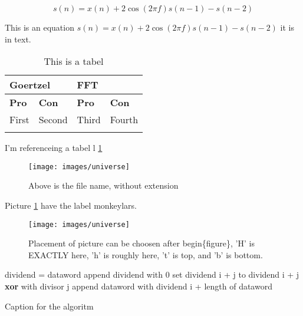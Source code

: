 \documentclass[a4paper,11pt,danish,oneside]{article}
\begin{document}
\begin{equation}
	s(n)=x(n)+2 \cos(2 \pi f) s(n-1)-s(n-2)
\end{equation}

This is an equation $s(n)=x(n)+2 \cos(2 \pi f) s(n-1)-s(n-2)$ it is in text.

\begin{table}[h]
	\begin{tabularx}{\textwidth}{|X|X|X|X|}
		\hline
		\multicolumn{2}{|l|}{\textbf{Goertzel}} & \multicolumn{2}{l|}{\textbf{FFT}} \\ \hline
	\textbf{Pro} & \textbf{Con} & \textbf{Pro} & \textbf{Con} \\ \hline
	First & Second & Third & Fourth \\ \hline
	& & & \\ \hline
	\end{tabularx}
	\caption{This is a tabel}
	\label{tabel1}
\end{table}

I'm referenceing a tabel l \ref{tabel1}

\begin{figure}[h]
	\centering
	\texttt{[image: images/universe]}
	\caption{Above is the file name, without extension}
	\label{monkeylars}
\end{figure}

Picture \ref{monkeylars} have the label monkeylars.


\begin{figure}[H]
	\centering
	\texttt{[image: images/universe]}
	\caption{ Placement of picture can be choosen after begin\{figure\}, 'H' is EXACTLY here, 'h' is roughly here, 't' is top, and 'b' is bottom.}
\end{figure}



\begin{algorithm}[h]
	\begin{algorithmic}[1]
		\State dividend = dataword
		\State append dividend with 0 
		\EndFor
		\State set dividend i + j to dividend i + j \textbf{xor} with divisor j
		\EndFor
		\EndIf
		\EndFor
		\State append dataword with dividend i + length of dataword
		\EndFor
		\EndProcedure
	\end{algorithmic}
	\caption{Caption for the algoritm}
	\label{algo1}
\end{algorithm}
\end{document}

